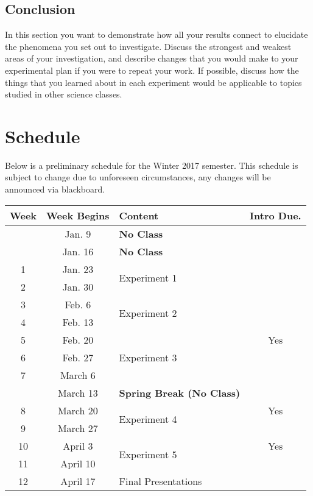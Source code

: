 \subsection*{Conclusion}
In this section you want to demonstrate how all your results connect to elucidate the phenomena you set out to investigate.
Discuss the strongest and weakest areas of your investigation, and describe changes that you would make to your experimental plan if you were to repeat your work.
If possible, discuss how the things that you learned about in each experiment would be applicable to topics studied in other science classes.

\newpage

\section*{Schedule}
Below is a preliminary schedule for the Winter 2017 semester.
This schedule is subject to change due to unforeseen circumstances, any changes will be announced via blackboard.
\begin{table}[h]
	\centering
	\begin{tabular}{ |c|c|l|c| } 
	 \hline
	 \textbf{Week} & \textbf{Week Begins} & \textbf{Content}  & \textbf{Intro Due.} \\ 
	 \hline
	    & Jan. 9 & \textbf{No Class} & \\ 
	 \hline 
	    & Jan. 16 & \textbf{No Class} & \\ 
	 \hline
	 1 & Jan. 23 & \multirow{2}{*}{Experiment 1} & \\ 
	 \cline{1-2} \cline{4-4}
	 2 & Jan. 30 & & \\ 
	 \hline
	 3 & Feb. 6 & \multirow{2}{*}{Experiment 2} &  \\ 
	 \cline{1-2} \cline{4-4}
	 4 & Feb. 13 & & \\ 
	 \hline
	 5 & Feb. 20 & \multirow{3}{*}{Experiment 3} & Yes \\ 
	 \cline{1-2} \cline{4-4}
	 6 & Feb. 27 & & \\ 
	 \cline{1-2} \cline{4-4}
	 7 & March 6 & & \\ 
	 \hline
	   & March 13 & \textbf{Spring Break (No Class)} & \\ 
	 \hline
	 8 & March 20 & \multirow{2}{*}{Experiment 4} & Yes \\ 
	 \cline{1-2} \cline{4-4}
	 9 & March 27 & & \\ 
	 \hline
	 10 & April 3 & \multirow{2}{*}{Experiment 5} & Yes \\ 
	 \cline{1-2} \cline{4-4}
	 11 & April 10 & & \\ 
	 \hline
	 12 & April 17 & Final Presentations & \\ 
	 \hline
	\end{tabular}
\end{table}

